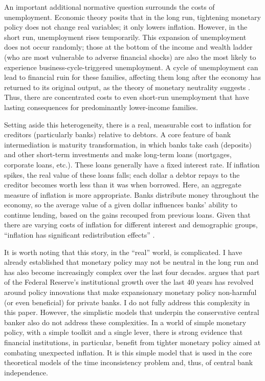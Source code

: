 \documentclass[12pt,a4paper]{article}
\begin{document}
\begin{doublespace}
An important additional normative question surrounds the costs of unemployment. Economic theory posits that in the long run, tightening monetary policy does not change real variables; it only lowers inflation. However, in the short run, unemployment rises temporarily. This expansion of unemployment does not occur randomly; those at the bottom of the income and wealth ladder (who are most vulnerable to adverse financial shocks) are also the most likely to experience business-cycle-triggered unemployment. A cycle of unemployment can lead to financial ruin for these families, affecting them long after the economy has returned to its original output, as the theory of monetary neutrality suggests \parencite{jacobs_fed_2021}. Thus, there are concentrated costs to even short-run unemployment that have lasting consequences for predominantly lower-income families. 


Setting aside this heterogeneity, there is a real, measurable cost to inflation for creditors (particularly banks) relative to debtors. A core feature of bank intermediation is maturity transformation, in which banks take cash (deposits) and other short-term investments and make long-term loans (mortgages, corporate loans, etc.). These loans generally have a fixed interest rate. If inflation spikes, the real value of these loans falls; each dollar a debtor repays to the creditor becomes worth less than it was when borrowed. Here, an aggregate measure of inflation is more appropriate. Banks distribute money throughout the economy, so the average value of a given dollar influences banks' ability to continue lending, based on the gains recouped from previous loans. Given that there are varying costs of inflation for different interest and demographic groups, ``inflation has significant redistribution effects'' \parencite[256]{posen_declarations_1995}.

It is worth noting that this story, in the ``real'' world, is complicated. I have already established that monetary policy may not be neutral in the long run and has also become increasingly complex over the last four decades. \textcite{wansleben_rise_2023} argues that part of the Federal Reserve's institutional growth over the last 40 years has revolved around policy innovations that make expansionary monetary policy non-harmful (or even beneficial) for private banks. I do not fully address this complexity in this paper. However, the simplistic models that underpin the conservative central banker also do not address these complexities. In a world of simple monetary policy, with a simple toolkit and a single lever, there is strong evidence that financial institutions, in particular, benefit from tighter monetary policy aimed at combating unexpected inflation. It is this simple model that is used in the core theoretical models of the time inconsistency problem and, thus, of central bank independence.



\end{doublespace}
\end{document}

